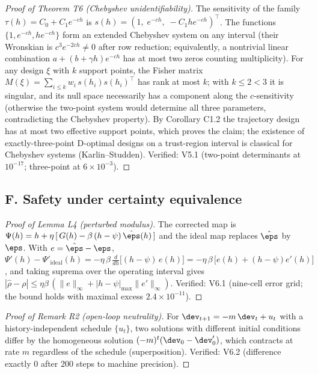 \documentclass[11pt]{article}
\begin{document}
\begin{proof}[Proof of Theorem T6 (Chebyshev unidentifiability)]
The sensitivity of the family $\tau(h) = C_0 + C_1 e^{-ch}$ is
$s(h) = (1,\; e^{-ch},\; -C_1 h e^{-ch})^\top$. The functions
$\{1, e^{-ch}, h e^{-ch}\}$ form an extended Chebyshev system on any
interval (their Wronskian is $c^3 e^{-2ch} \ne 0$ after row reduction;
equivalently, a nontrivial linear combination
$a + (b + \gamma h)e^{-ch}$ has at most two zeros counting multiplicity).
For any design $\xi$ with $k$ support points, the Fisher matrix
$M(\xi) = \sum_{i\le k} w_i\, s(h_i) s(h_i)^\top$ has rank at most $k$;
with $k \le 2 < 3$ it is singular, and its null space necessarily has a
component along the $c$-sensitivity (otherwise the two-point system would
determine all three parameters, contradicting the Chebyshev property). By
Corollary C1.2 the trajectory design has at most two effective support
points, which proves the claim; the existence of exactly-three-point
D-optimal designs on a trust-region interval is classical for Chebyshev
systems (Karlin--Studden). Verified: V5.1 (two-point determinants at
$10^{-17}$; three-point at $6\times 10^{-3}$).
\end{proof}

\subsection*{F. Safety under certainty equivalence}

\begin{proof}[Proof of Lemma L4 (perturbed modulus)]
The corrected map is $\Psi(h) = h + \eta\,[\,G(h) - \beta\,(h-\psi)\,
\hat\eps(h)\,]$ and the ideal map replaces $\hat\eps$ by $\eps$. With
$e = \hat\eps - \eps$,
$\Psi'(h) - \Psi'_{\mathrm{ideal}}(h) = -\eta\,\beta\,\tfrac{d}{dh}
\big[(h-\psi)\,e(h)\big] = -\eta\,\beta\,\big[e(h) + (h-\psi)e'(h)\big]$,
and taking suprema over the operating interval gives
$|\hat\rho - \rho| \le \eta\beta\,(\|e\|_\infty + |h-\psi|_{\max}
\|e'\|_\infty)$. Verified: V6.1 (nine-cell error grid; the bound holds
with maximal excess $2.4\times10^{-11}$).
\end{proof}

\begin{proof}[Proof of Remark R2 (open-loop neutrality)]
For $\dev_{t+1} = -m\,\dev_t + u_t$ with a history-independent schedule
$\{u_t\}$, two solutions with different initial conditions differ by the
homogeneous solution $(-m)^t(\dev_0 - \dev_0')$, which contracts at rate
$m$ regardless of the schedule (superposition). Verified: V6.2 (difference
exactly $0$ after $200$ steps to machine precision).
\end{proof}
\end{document}
